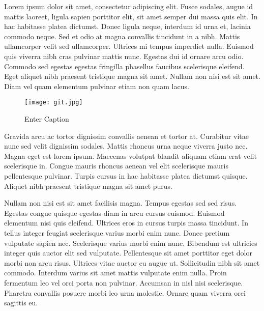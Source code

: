 \documentclass[12pt, a4paper]{article}
\begin{document}
 Lorem ipsum dolor sit amet, consectetur adipiscing elit. Fusce sodales, augue id mattis laoreet, ligula sapien porttitor elit, sit amet semper dui massa quis elit. In hac habitasse platea dictumst. Donec ligula neque, interdum id urna et, lacinia commodo neque. Sed et odio at magna convallis tincidunt in a nibh. Mattis ullamcorper velit sed ullamcorper. Ultrices mi tempus imperdiet nulla. Euismod quis viverra nibh cras pulvinar mattis nunc. Egestas dui id ornare arcu odio. Commodo sed egestas egestas fringilla phasellus faucibus scelerisque eleifend. Eget aliquet nibh praesent tristique magna sit amet. Nullam non nisi est sit amet. Diam vel quam elementum pulvinar etiam non quam lacus.  
\begin{figure}
    \centering
    \texttt{[image: git.jpg]}
    \caption{Enter Caption}
    \label{fig:enter-label}
\end{figure}
Gravida arcu ac tortor dignissim convallis aenean et tortor at. Curabitur vitae nunc sed velit dignissim sodales. Mattis rhoncus urna neque viverra justo nec. Magna eget est lorem ipsum. Maecenas volutpat blandit aliquam etiam erat velit scelerisque in. Congue mauris rhoncus aenean vel elit scelerisque mauris pellentesque pulvinar. Turpis cursus in hac habitasse platea dictumst quisque. Aliquet nibh praesent tristique magna sit amet purus.

 Nullam non nisi est sit amet facilisis magna. Tempus egestas sed sed risus. Egestas congue quisque egestas diam in arcu cursus euismod. Euismod elementum nisi quis eleifend. Ultrices eros in cursus turpis massa tincidunt. In tellus integer feugiat scelerisque varius morbi enim nunc. Donec pretium vulputate sapien nec. Scelerisque varius morbi enim nunc. Bibendum est ultricies integer quis auctor elit sed vulputate. Pellentesque sit amet porttitor eget dolor morbi non arcu risus. Ultrices vitae auctor eu augue ut. Sollicitudin nibh sit amet commodo. Interdum varius sit amet mattis vulputate enim nulla.
Proin fermentum leo vel orci porta non pulvinar. Accumsan in nisl nisi scelerisque. Pharetra convallis posuere morbi leo urna molestie. Ornare quam viverra orci sagittis eu.

\newpage
\end{document}

